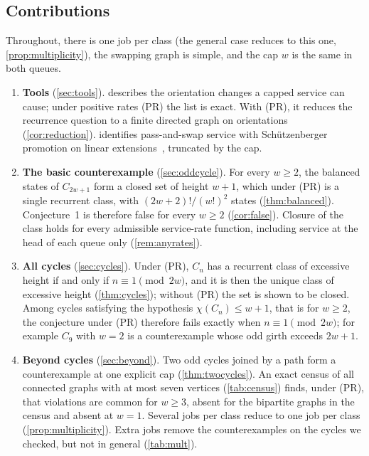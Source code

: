 \documentclass[11pt,a4paper]{article}
\theoremstyle{plain}
\theoremstyle{plain}
\begin{document}
\subsection{Contributions}\label{sec:contrib}

Throughout, there is one job per class (the general case reduces to this one, \cref{prop:multiplicity}), the swapping graph is simple, and the cap $w$ is the same in both queues.

\begin{enumerate}[label=\textbf{C\arabic*.},leftmargin=*]
\item \textbf{Tools} (\cref{sec:tools}).  describes the orientation changes a capped service can cause; under positive rates (PR) the list is exact. With (PR), it reduces the recurrence question to a finite directed graph on orientations (\cref{cor:reduction}).  identifies pass-and-swap service with Sch\"utzenberger promotion on linear extensions~\cite{Sch1972,Sta2009,AKS2014}, truncated by the cap.
\item \textbf{The basic counterexample} (\cref{sec:oddcycle}). For every $w\ge2$, the balanced states of $C_{2w+1}$ form a closed set of height $w+1$, which under (PR) is a single recurrent class, with $(2w+2)!/(w!)^2$ states (\cref{thm:balanced}). Conjecture~1 is therefore false for every $w\ge2$ (\cref{cor:false}). Closure of the class holds for every admissible service-rate function, including service at the head of each queue only (\cref{rem:anyrates}).
\item \textbf{All cycles} (\cref{sec:cycles}). Under (PR), $C_n$ has a recurrent class of excessive height if and only if $n\equiv1\pmod{2w}$, and it is then the unique class of excessive height (\cref{thm:cycles}); without (PR) the set is shown to be closed. Among cycles satisfying the hypothesis $\chi(C_n)\le w+1$, that is for $w\ge2$, the conjecture under (PR) therefore fails exactly when $n\equiv1\pmod{2w}$; for example $C_9$ with $w=2$ is a counterexample whose odd girth exceeds $2w+1$.
\item \textbf{Beyond cycles} (\cref{sec:beyond}). Two odd cycles joined by a path form a counterexample at one explicit cap (\cref{thm:twocycles}). An exact census of all connected graphs with at most seven vertices (\cref{tab:census}) finds, under (PR), that violations are common for $w\ge3$, absent for the bipartite graphs in the census and absent at $w=1$. Several jobs per class reduce to one job per class (\cref{prop:multiplicity}). Extra jobs remove the counterexamples on the cycles we checked, but not in general (\cref{tab:mult}).

\end{enumerate}
\end{document}
